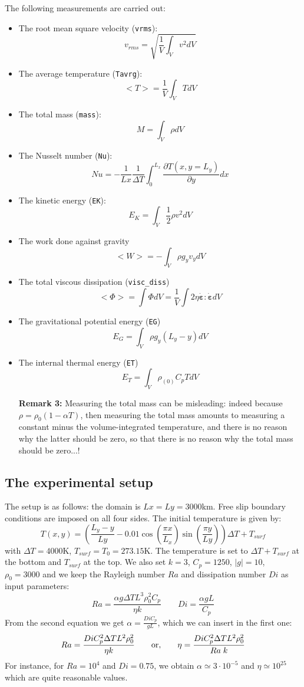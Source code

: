 The following measurements are carried out:
\begin{itemize}
\item The root mean square velocity ({\tt vrms}):
\[
v_{rms} = \sqrt{\frac{1}{V}\int_V v^2 dV   }
\]
\item The average temperature ({\tt Tavrg}):
\[
<T>=\frac{1}{V}\int_V T dV
\]
\item The total mass ({\tt mass}):
\[
M=\int_V \rho dV 
\]
\item The Nusselt number ({\tt Nu}):
\[
Nu=-\frac{1}{Lx}\frac{1}{\Delta T} \int_0^{L_x} \frac{\partial T(x,y=L_y)}{\partial y} dx
\]
\item The kinetic energy ({\tt EK}):
\[
E_K=\int_V \frac{1}{2}\rho v^2 dV
\]
\item The work done against gravity 
\[
<W>=-\int_V \rho g_y v_y dV
\]
\item The total viscous dissipation ({\tt visc\_diss})
\[
<\Phi>=\int \Phi dV =\frac{1}{V}\int 2 \eta \dot{\bm \varepsilon}:\dot{\bm \varepsilon} dV 
\]
\item The gravitational potential energy ({\tt EG})
\[
E_G = \int_V \rho g_y (L_y-y) dV
\]
\item The internal thermal energy ({\tt ET})
\[
E_T = \int_V \rho_{(0)} C_p T dV
\]

{\bf Remark 3:} Measuring the total mass can be misleading: indeed because $\rho=\rho_0(1-\alpha T)$, then 
measuring the total mass amounts to measuring a constant minus the volume-integrated temperature, and there is 
no reason why the latter should be zero, so that there is no reason why the total mass should be zero...!

\end{itemize}




\subsection{The experimental setup}

The setup is as follows: the domain is $Lx=Ly=3000$km. Free slip boundary conditions are imposed on all four sides. 
The initial temperature is given by:
\[
T(x,y) = \left(  \frac{L_y-y}{Ly} - 0.01\cos(\frac{\pi x}{L_x}) \sin(\frac{\pi y}{Ly}) \right) \Delta T + T_{surf}
\]
with $\Delta T=4000$K, $T_{surf}=T_0=273.15$K. The temperature is set to $\Delta T + T_{surf}$ at the bottom and $T_{surf}$ at the top.
We also set $k=3$, $C_p=1250$, $|g|=10$, $\rho_0=3000$ and we keep the Rayleigh number $Ra$ and dissipation number $Di$ as input parameters:
\[
Ra=\frac{\alpha g \Delta T L^3 \rho_0^2 C_p}{\eta k}
\quad\quad
Di=\frac{\alpha g L}{C_p}
\]
From the second equation we get $\alpha=\frac{Di C_p}{g L}$, which we can insert in the first one:
\[
Ra=\frac{Di C_p^2 \Delta T L^2 \rho_0^2 }{\eta k}
\quad\quad
{\rm or,}
\quad\quad
\eta=
\frac{Di C_p^2 \Delta T L^2 \rho_0^2 }{Ra \; k  }
\]
For instance, for $Ra=10^4$ and $Di=0.75$, we obtain $\alpha\simeq 3\cdot 10^{-5}$ and $\eta\simeq 10^{25}$ 
which are quite reasonable values. 


